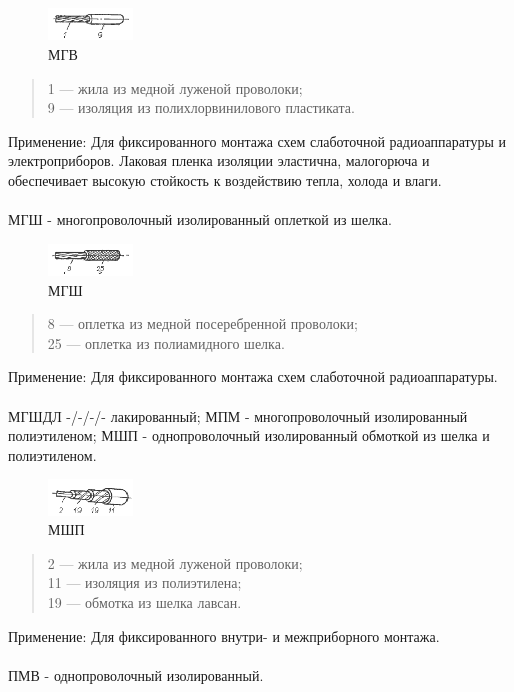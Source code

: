 \documentclass[unicode, 12pt, a4paper, oneside]{article}
\begin{document}
\begin{figure}[H]
\centering
\includegraphics[width=0.2\textwidth]{76_MGV.png}
\caption{МГВ}
\end{figure}

\begin{verse}
1 — жила из медной луженой проволоки;\\
9 — изоляция из полихлорвинилового пластиката.\\ 
\end{verse}
Применение: Для фиксированного монтажа схем слаботочной радиоаппаратуры и электроприборов. Лаковая пленка изоляции эластична, малогорюча и обеспечивает высокую стойкость к воздействию тепла, холода и влаги.
\\ \\
МГШ - многопроволочный изолированный оплеткой из шелка.

\begin{figure}[H]
\centering
\includegraphics[width=0.2\textwidth]{76_MGSH.png}
\caption{МГШ}
\end{figure}

\begin{verse}
8 — оплетка из медной посеребренной проволоки;\\ 
25 — оплетка из полиамидного шелка.\\
\end{verse}
Применение: Для фиксированного монтажа схем слаботочной радиоаппаратуры.
\\ \\
МГШДЛ -/-/-/- лакированный;
МПМ - многопроволочный изолированный полиэтиленом;
МШП - однопроволочный изолированный обмоткой из шелка и полиэтиленом.

\begin{figure}[H]
\centering
\includegraphics[width=0.2\textwidth]{76_MSHP.png}
\caption{МШП}
\end{figure}

\begin{verse}
2 — жила из медной луженой проволоки;\\ 
11 — изоляция из полиэтилена;\\ 
19 — обмотка из шелка лавсан.\\
\end{verse}
Применение: Для фиксированного внутри- и межприборного монтажа.
\\ \\
ПМВ - однопроволочный изолированный.
\end{document}
